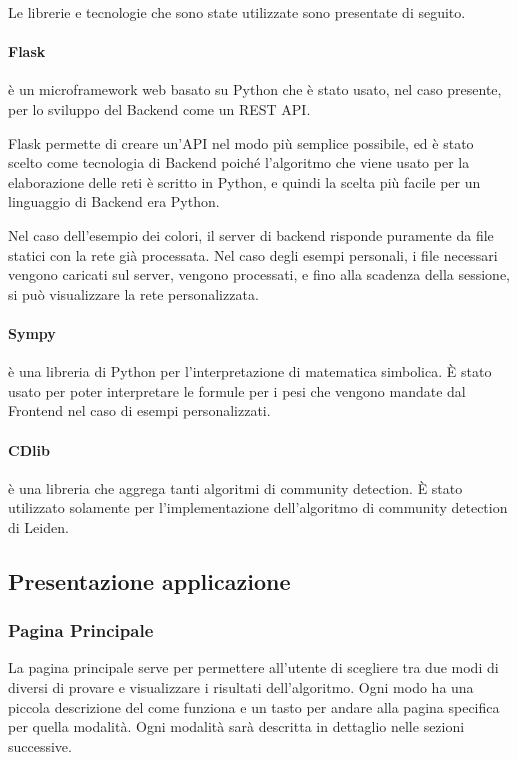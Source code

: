 \documentclass[a4paper,12pt]{report}
\begin{document}
			Le librerie e tecnologie che sono state utilizzate sono presentate di seguito.
			
			\paragraph*{Flask} è un microframework web basato su Python che è stato usato, nel caso presente, per lo sviluppo del Backend come un REST API. \cite{flaskforeword}

				Flask permette di creare un’API nel modo più semplice possibile, ed è stato scelto come tecnologia di Backend poiché l'algoritmo che viene usato per la elaborazione delle reti è scritto in Python, e quindi la scelta più facile per un linguaggio di Backend era Python. 

				Nel caso dell'esempio dei colori, il server di backend risponde puramente da file statici con la rete già processata. Nel caso degli esempi personali, i file necessari vengono caricati sul server, vengono processati, e fino alla scadenza della sessione, si può visualizzare la rete personalizzata.

			\paragraph*{Sympy} è una libreria di Python per l'interpretazione di matematica simbolica. È stato usato per poter interpretare le formule per i pesi che vengono mandate dal Frontend nel caso di esempi personalizzati. \cite{sympy}

			\paragraph*{CDlib} è una libreria che aggrega tanti algoritmi di community detection. È stato utilizzato solamente per l'implementazione dell'algoritmo di community detection di Leiden. \cite{cdlib}
			
		\subsection{Presentazione applicazione}
			
			\subsubsection{Pagina Principale}
			La pagina principale serve per permettere all'utente di scegliere tra due modi di diversi di provare e visualizzare i risultati dell'algoritmo. Ogni modo ha una piccola descrizione del come funziona e un tasto per andare alla pagina specifica per quella modalità. Ogni modalità sarà descritta in dettaglio nelle sezioni successive.
\end{document}
